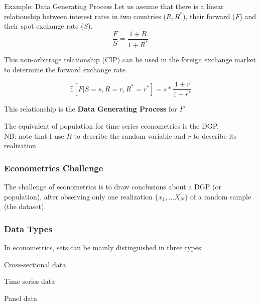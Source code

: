 \documentclass{beamer}
\newenvironment{wideenumerate}{\enumerate\addtolength{\itemsep}{10pt}}{\endenumerate}
\begin{document}
\begin{frame}

  \begin{exampleblock}{Example: Data Generating Process}
    Let us assume that there is a linear relationship between interest rates in two countries ($R, R^*$), their forward ($F$) and their spot exchange rate ($S$).\\

    \begin{equation*}
      \frac{F}{S} = \frac{1+R}{1+R^*}
    \end{equation*}

    This non-arbitrage relationship (CIP) can be used in the foreign exchange market to determine the forward exchange rate

    \begin{equation*}
      \mathbb{E}[F |S=s, R=r, R^*= r^*] = s*\frac{1+r}{1+r^*}
    \end{equation*}

This relationship is the \textbf{Data Generating Process} for $F$     
  \end{exampleblock}

The equivalent of population for time series econometrics is the DGP.\\
NB: note that I use $R$ to describe the random variable and $r$ to describe its realization
  
\end{frame}


\begin{frame}
  \frametitle{Econometrics Challenge}
  The challenge of econometrics is to draw conclusions about a DGP (or population), after observing only one realization $\{x_1, \dots X_N\}$ of a random sample (the dataset).\\

  
\end{frame}


\begin{frame}
  \frametitle{Data Types}

  In econometrics, sets can be mainly distinguished in three types:\\
  \smallskip
  
  \begin{wideenumerate}
    \item Cross-sectional data
    \item Time series data
    \item Panel data
  \end{wideenumerate}
  
\end{frame}
\end{document}

